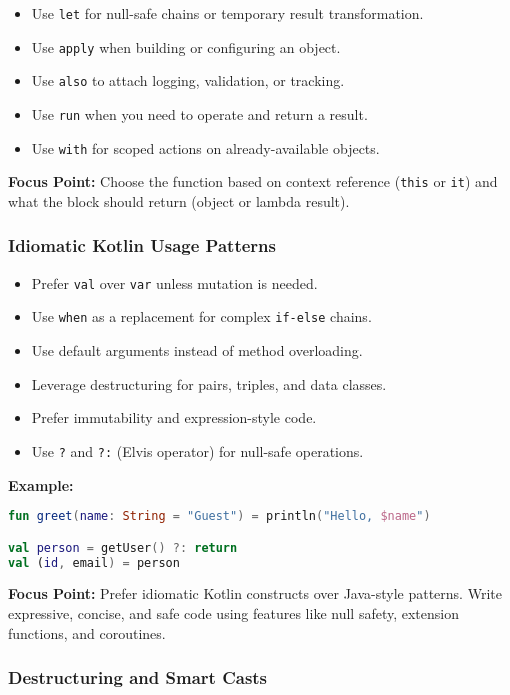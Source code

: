 \documentclass[a4paper,12pt]{article}
\begin{document}
\begin{itemize}
  \item Use \texttt{let} for null-safe chains or temporary result transformation.
  \item Use \texttt{apply} when building or configuring an object.
  \item Use \texttt{also} to attach logging, validation, or tracking.
  \item Use \texttt{run} when you need to operate and return a result.
  \item Use \texttt{with} for scoped actions on already-available objects.
\end{itemize}

\textbf{Focus Point:} Choose the function based on context reference (\texttt{this} or \texttt{it}) and what the block should return (object or lambda result).

\subsubsection{Idiomatic Kotlin Usage Patterns}

\begin{itemize}
  \item Prefer \texttt{val} over \texttt{var} unless mutation is needed.
  \item Use \texttt{when} as a replacement for complex \texttt{if-else} chains.
  \item Use default arguments instead of method overloading.
  \item Leverage destructuring for pairs, triples, and data classes.
  \item Prefer immutability and expression-style code.
  \item Use \texttt{?} and \texttt{?:} (Elvis operator) for null-safe operations.
\end{itemize}

\textbf{Example:}
\begin{lstlisting}[language=Kotlin]
fun greet(name: String = "Guest") = println("Hello, $name")

val person = getUser() ?: return
val (id, email) = person
\end{lstlisting}

\textbf{Focus Point:} Prefer idiomatic Kotlin constructs over Java-style patterns. Write expressive, concise, and safe code using features like null safety, extension functions, and coroutines.

\subsubsection{Destructuring and Smart Casts}
\end{document}
